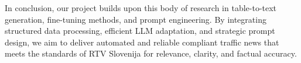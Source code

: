 \documentclass[fleqn,moreauthors,10pt]{ds_report}
\begin{document}
In conclusion, our project builds upon this body of research in table-to-text generation, fine-tuning methods, and prompt engineering. By integrating structured data processing, efficient LLM adaptation, and strategic prompt design, we aim to deliver automated and reliable compliant traffic news that meets the standards of RTV Slovenija for relevance, clarity, and factual accuracy.



\end{document}
